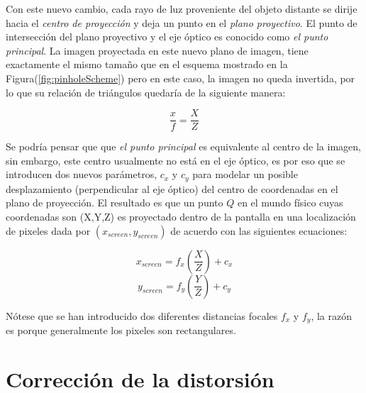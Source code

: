 \documentclass{book}
\begin{document}
Con este nuevo cambio, cada rayo de luz proveniente del objeto distante se dirije hacia el \textit{centro de proyección} y deja un punto en el \textit{plano proyectivo}. El punto de intersección del plano proyectivo y el eje óptico es conocido como \textit{el punto principal}. La imagen proyectada en este nuevo plano de imagen, tiene exactamente el mismo tamaño que en el esquema mostrado en la Figura(\ref{fig:pinholeScheme}) pero en este caso, la imagen no queda invertida, por lo que su relación de triángulos quedaría de la siguiente manera: 

\[\frac{x}{f} = \frac{X}{Z}\]

Se podría pensar que que \textit{el punto principal} es equivalente al centro de la imagen, sin embargo, este centro usualmente no está en el eje óptico, es por eso que se introducen dos nuevos parámetros, $c_{x}$ y $c_{y}$ para modelar un posible desplazamiento (perpendicular al eje óptico) del centro de coordenadas en el plano de proyección. El resultado es que un punto $Q$ en el mundo físico cuyas coordenadas son  (X,Y,Z) es proyectado dentro de la pantalla en una localización de pixeles dada por $(x_{screen},y_{screen})$ de acuerdo con las siguientes ecuaciones:

\[x_{screen}=f_{x}\left(\frac{X}{Z}\right ) + c_{x}\]	
\[y_{screen}=f_{y}\left(\frac{Y}{Z}\right ) + c_{y}\]

Nótese que se han introducido dos diferentes distancias focales $f_{x}$ y $f_{y}$, la razón es porque generalmente los pixeles son rectangulares.
		
\section{Corrección de la distorsión}
\end{document}
